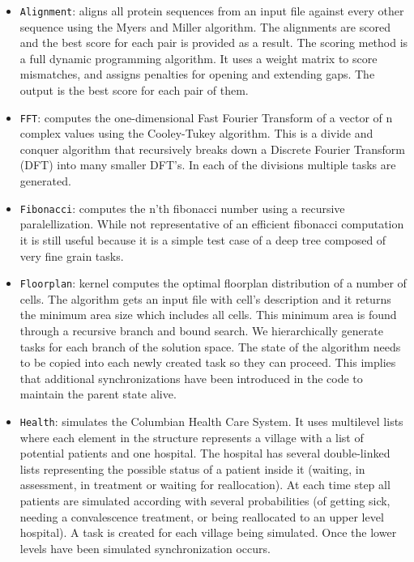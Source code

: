 \documentclass[sigconf]{acmart}
\begin{document}
\begin{itemize}
\item \texttt{Alignment}: aligns all protein sequences from  an  input
file  against  every  other  sequence  using  the Myers and Miller 
algorithm. The alignments are scored and the best score for each pair is
provided as a result. The scoring method is  a  full  dynamic  programming
algorithm. It uses  a  weight matrix to score mismatches, and assigns
penalties for opening and extending gaps. The output is the best score for each
pair of them.
\item \texttt{FFT}: computes the one-dimensional Fast Fourier Transform
of a vector of n complex values using the Cooley-Tukey 
algorithm. This is a divide and conquer algorithm that  recursively  breaks
down a Discrete Fourier Transform (DFT) into many smaller DFT’s. In each of the
divisions multiple tasks are generated.
\item \texttt{Fibonacci}: computes the n'th fibonacci number using a  recursive
paralellization. While  not  representative  of  an efficient  fibonacci
computation  it  is  still  useful  because  it  is a simple test case of a
deep tree composed of very fine grain tasks.  
\item \texttt{Floorplan}: kernel computes the optimal floorplan distribution
of a number of cells. The algorithm gets an input file with  cell’s
description  and  it  returns  the  minimum  area  size which includes all
cells. This minimum area is found through a recursive branch and bound search.
We hierarchically generate tasks  for  each  branch  of  the  solution  space.
The  state  of  the algorithm needs to be copied into each newly created task
so they can proceed. This implies that additional synchronizations have been
introduced in the code to maintain the parent state alive.
\item \texttt{Health}: simulates the Columbian Health Care System. It
uses multilevel lists where each element in the structure  represents  a
village with  a  list  of  potential patients and one hospital. The hospital
has several double-linked lists representing the possible status of a patient
inside it (waiting, in assessment,   in   treatment   or   waiting   for
reallocation).  At  each time step  all  patients  are  simulated  according
with several probabilities (of getting sick, needing a convalescence treatment,
or  being  reallocated to  an  upper  level  hospital).  A  task  is  created
for  each  village being  simulated. Once the lower levels have been simulated
synchronization occurs. 

\end{itemize}
\end{document}
